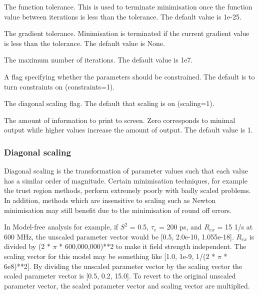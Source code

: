   The function tolerance.  This is used to terminate minimisation once the function value between iterations is less than the tolerance.  The default value is 1e-25. 

  The gradient tolerance.  Minimisation is terminated if the current gradient value is less than the tolerance.  The default value is None. 

  The maximum number of iterations.  The default value is 1e7. 

  A flag specifying whether the parameters should be constrained.  The default is to turn constraints on (constraints=1). 

  The diagonal scaling flag.  The default that scaling is on (scaling=1). 



  The amount of information to print to screen.  Zero corresponds to minimal output while higher values increase the amount of output.  The default value is 1. 




\subsubsection{Diagonal scaling}

Diagonal scaling is the transformation of parameter values such that each value has a similar order of magnitude.  Certain minimisation techniques, for example the trust region methods, perform extremely poorly with badly scaled problems.  In addition, methods which are insensitive to scaling such as Newton minimisation may still benefit due to the minimisation of round off errors.


In Model-free analysis for example, if $S^2$ = 0.5, $\tau_e$ = 200 ps, and $R_{ex}$ = 15 1/s at 600 MHz, the unscaled parameter vector would be [0.5, 2.0e-10, 1.055e-18].  $R_{ex}$ is divided by (2 * $\pi$ * 600,000,000)**2 to make it field strength independent.  The scaling vector for this model may be something like [1.0, 1e-9, 1/(2 * $\pi$ * 6e8)**2].  By dividing the unscaled parameter vector by the scaling vector the scaled parameter vector is [0.5, 0.2, 15.0].  To revert to the original unscaled parameter vector, the scaled parameter vector and scaling vector are multiplied.



